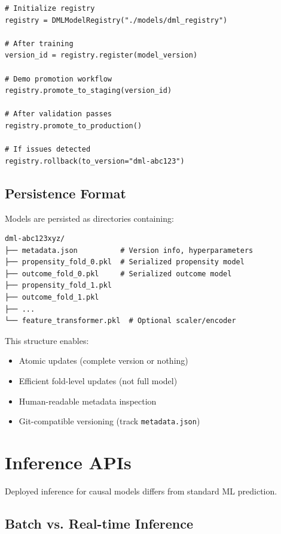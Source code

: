 \begin{verbatim}
# Initialize registry
registry = DMLModelRegistry("./models/dml_registry")

# After training
version_id = registry.register(model_version)

# Demo promotion workflow
registry.promote_to_staging(version_id)

# After validation passes
registry.promote_to_production()

# If issues detected
registry.rollback(to_version="dml-abc123")
\end{verbatim}

\subsection{Persistence Format}

Models are persisted as directories containing:

\begin{verbatim}
dml-abc123xyz/
├── metadata.json          # Version info, hyperparameters
├── propensity_fold_0.pkl  # Serialized propensity model
├── outcome_fold_0.pkl     # Serialized outcome model
├── propensity_fold_1.pkl
├── outcome_fold_1.pkl
├── ...
└── feature_transformer.pkl  # Optional scaler/encoder
\end{verbatim}

This structure enables:
\begin{itemize}
    \item Atomic updates (complete version or nothing)
    \item Efficient fold-level updates (not full model)
    \item Human-readable metadata inspection
    \item Git-compatible versioning (track \texttt{metadata.json})
\end{itemize}


\section{Inference APIs}\label{sec:inference_apis}

Deployed inference for causal models differs from standard ML prediction.

\subsection{Batch vs. Real-time Inference}

